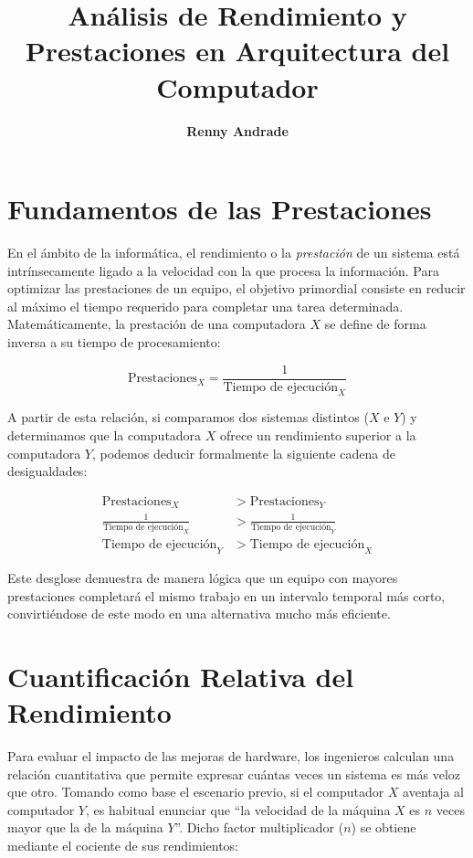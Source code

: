 \documentclass[12pt,a4paper]{article}
\title{\textbf{Análisis de Rendimiento y Prestaciones en Arquitectura del Computador}}
\author{\textbf{Renny Andrade}}
\date{}
\begin{document}
	
	\maketitle
	
	\section{Fundamentos de las Prestaciones}
	
	En el ámbito de la informática, el rendimiento o la \textit{prestación} de un sistema está intrínsecamente ligado a la velocidad con la que procesa la información. Para optimizar las prestaciones de un equipo, el objetivo primordial consiste en reducir al máximo el tiempo requerido para completar una tarea determinada. Matemáticamente, la prestación de una computadora $X$ se define de forma inversa a su tiempo de procesamiento:
	
	\begin{equation}
		\text{Prestaciones}_X = \frac{1}{\text{Tiempo de ejecución}_X}
	\end{equation}
	
	A partir de esta relación, si comparamos dos sistemas distintos ($X$ e $Y$) y determinamos que la computadora $X$ ofrece un rendimiento superior a la computadora $Y$, podemos deducir formalmente la siguiente cadena de desigualdades:
	
	\begin{align}
		\text{Prestaciones}_X &> \text{Prestaciones}_Y \\[0.3cm]
		\frac{1}{\text{Tiempo de ejecución}_X} &> \frac{1}{\text{Tiempo de ejecución}_Y} \\[0.3cm]
		\text{Tiempo de ejecución}_Y &> \text{Tiempo de ejecución}_X
	\end{align}
	
	Este desglose demuestra de manera lógica que un equipo con mayores prestaciones completará el mismo trabajo en un intervalo temporal más corto, convirtiéndose de este modo en una alternativa mucho más eficiente.

    \clearpage
	
	\section{Cuantificación Relativa del Rendimiento}
	
	Para evaluar el impacto de las mejoras de hardware, los ingenieros calculan una relación cuantitativa que permite expresar cuántas veces un sistema es más veloz que otro. Tomando como base el escenario previo, si el computador $X$ aventaja al computador $Y$, es habitual enunciar que ``la velocidad de la máquina $X$ es $n$ veces mayor que la de la máquina $Y$''. Dicho factor multiplicador ($n$) se obtiene mediante el cociente de sus rendimientos:
	
\end{document}
